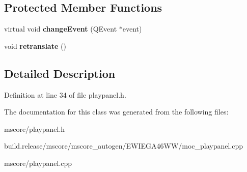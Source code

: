 \subsection*{Protected Member Functions}
\begin{DoxyCompactItemize}
\item 
\mbox{\label{class_ms_1_1_play_panel_a5a7b884a3c35dce72acb348606be1d90}} 
virtual void {\bfseries change\+Event} (Q\+Event $\ast$event)
\item 
\mbox{\label{class_ms_1_1_play_panel_a1ee33bb6a261958f03ccaa90d64598f9}} 
void {\bfseries retranslate} ()
\end{DoxyCompactItemize}


\subsection{Detailed Description}


Definition at line 34 of file playpanel.\+h.



The documentation for this class was generated from the following files\+:\begin{DoxyCompactItemize}
\item 
mscore/playpanel.\+h\item 
build.\+release/mscore/mscore\+\_\+autogen/\+E\+W\+I\+E\+G\+A46\+W\+W/moc\+\_\+playpanel.\+cpp\item 
mscore/playpanel.\+cpp\end{DoxyCompactItemize}
